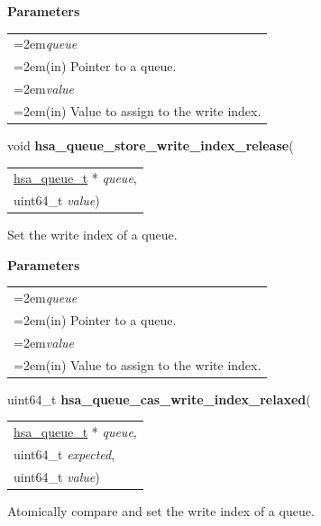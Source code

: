 \documentclass[final]{book}
\newcommand{\hsaarg}[1]{\textit{#1}}
\begin{document}
\noindent\textbf{Parameters}\\[-6mm]
\noindent\begin{longtable}{@{}>{\hangindent=2em}p{\textwidth}}
\hsaarg{queue}\\\hspace{2em}(in) Pointer to a queue.\\[2mm]
\hsaarg{value}\\\hspace{2em}(in) Value to assign to the write index.
\end{longtable}
 


\noindent\begin{tcolorbox}[breakable,nobeforeafter,colframe=white,colback=lightgray,left=0mm]
void \hypertarget{group__queue_1ga105a5569dfc76284a633af4c983c23ea}{\textbf{hsa_queue_store_write_index_release}}(
\vspace{-3.5mm}\begin{longtable}{@{}p{\textwidth}}
\hspace{1.7em}\hyperlink{group__queue_1gacbb2835331f18aee30ee441f07b3fc5a}{hsa_queue_t} * \hsaarg{queue},\\
\hspace{1.7em}uint64_t \hsaarg{value})\end{longtable}

\end{tcolorbox}
Set the write index of a queue.

\noindent\textbf{Parameters}\\[-6mm]
\noindent\begin{longtable}{@{}>{\hangindent=2em}p{\textwidth}}
\hsaarg{queue}\\\hspace{2em}(in) Pointer to a queue.\\[2mm]
\hsaarg{value}\\\hspace{2em}(in) Value to assign to the write index.
\end{longtable}
 


\noindent\begin{tcolorbox}[breakable,nobeforeafter,colframe=white,colback=lightgray,left=0mm]
uint64_t \hypertarget{group__queue_1gac64736b757622a7151102afe34a40599}{\textbf{hsa_queue_cas_write_index_relaxed}}(
\vspace{-3.5mm}\begin{longtable}{@{}p{\textwidth}}
\hspace{1.7em}\hyperlink{group__queue_1gacbb2835331f18aee30ee441f07b3fc5a}{hsa_queue_t} * \hsaarg{queue},\\
\hspace{1.7em}uint64_t \hsaarg{expected},\\
\hspace{1.7em}uint64_t \hsaarg{value})\end{longtable}

\end{tcolorbox}
Atomically compare and set the write index of a queue.
\end{document}
